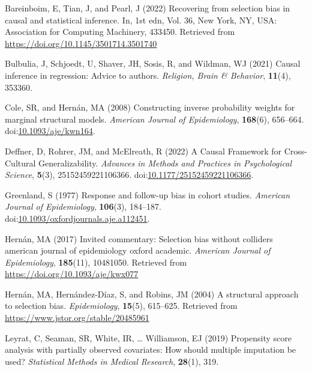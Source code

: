 \documentclass[
  singlecolumn,
  9pt]{article}
\newlength{\cslhangindent}
\newenvironment{CSLReferences}[2] %
 {\begin{list}{}{%
  \setlength{\itemindent}{0pt}
  \setlength{\leftmargin}{0pt}
  \setlength{\parsep}{0pt}
  \ifodd #1
   \setlength{\leftmargin}{\cslhangindent}
   \setlength{\itemindent}{-1\cslhangindent}
  \fi
  \setlength{\itemsep}{#2\baselineskip}}}
 {\end{list}}
\begin{document}
\label{refs}
\begin{CSLReferences}{1}{0}
Bareinboim, E, Tian, J, and Pearl, J (2022) Recovering from selection
bias in causal and statistical inference. In, 1st edn, Vol. 36, New
York, NY, USA: Association for Computing Machinery, 433450. Retrieved
from \url{https://doi.org/10.1145/3501714.3501740}

Bulbulia, J, Schjoedt, U, Shaver, JH, Sosis, R, and Wildman, WJ (2021)
Causal inference in regression: Advice to authors. \emph{Religion, Brain
\& Behavior}, \textbf{11}(4), 353360.

Cole, SR, and Hernán, MA (2008) Constructing inverse probability weights
for marginal structural models. \emph{American Journal of Epidemiology},
\textbf{168}(6), 656--664.
doi:\href{https://doi.org/10.1093/aje/kwn164}{10.1093/aje/kwn164}.

Deffner, D, Rohrer, JM, and McElreath, R (2022) A Causal Framework for
Cross-Cultural Generalizability. \emph{Advances in Methods and Practices
in Psychological Science}, \textbf{5}(3), 25152459221106366.
doi:\href{https://doi.org/10.1177/25152459221106366}{10.1177/25152459221106366}.

Greenland, S (1977) Response and follow-up bias in cohort studies.
\emph{American Journal of Epidemiology}, \textbf{106}(3), 184--187.
doi:\href{https://doi.org/10.1093/oxfordjournals.aje.a112451}{10.1093/oxfordjournals.aje.a112451}.

Hernán, MA (2017) Invited commentary: Selection bias without colliders
\textbar{} american journal of epidemiology \textbar{} oxford academic.
\emph{American Journal of Epidemiology}, \textbf{185}(11), 10481050.
Retrieved from \url{https://doi.org/10.1093/aje/kwx077}

Hernán, MA, Hernández-Díaz, S, and Robins, JM (2004) A structural
approach to selection bias. \emph{Epidemiology}, \textbf{15}(5),
615--625. Retrieved from \url{https://www.jstor.org/stable/20485961}

Leyrat, C, Seaman, SR, White, IR, \ldots{} Williamson, EJ (2019)
Propensity score analysis with partially observed covariates: How should
multiple imputation be used? \emph{Statistical Methods in Medical
Research}, \textbf{28}(1), 319.


\end{CSLReferences}
\end{document}
